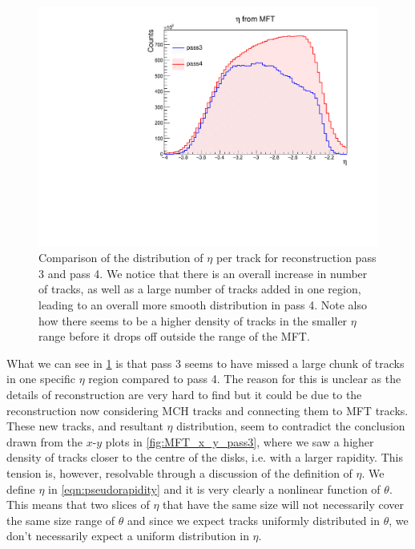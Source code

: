 \begin{figure}[H]
    \begin{center}
        \includegraphics[width=.8\textwidth]{Plots/pass3_pass4.pdf}
        \caption{Comparison of the distribution of $\eta$ per track for reconstruction pass 3 and pass 4. We notice that there is an overall increase in number of tracks, as well as a large number of tracks added in one region, leading to an overall more smooth distribution in pass 4. Note also how there seems to be a higher density of tracks in the smaller $\eta$ range before it drops off outside the range of the MFT.}
        \label{fig:pass3_pass4_eta}
    \end{center}
\end{figure}

What we can see in \cref{fig:pass3_pass4_eta} is that pass 3 seems to have missed a large chunk of tracks in one specific $\eta$ region compared to pass 4. The reason for this is unclear as the details of reconstruction are very hard to find but it could be due to the reconstruction now considering MCH tracks and connecting them to MFT tracks. These new tracks, and resultant $\eta$ distribution, seem to contradict the conclusion drawn from the $x$-$y$ plots in \cref{fig:MFT_x_y_pass3}, where we saw a higher density of tracks closer to the centre of the disks, i.e. with a larger rapidity. This tension is, however, resolvable through a discussion of the definition of $\eta$. We define $\eta$ in \cref{eqn:pseudorapidity} and it is very clearly a nonlinear function of $\theta$. This means that two slices of $\eta$ that have the same size will not necessarily cover the same size range of $\theta$ and since we expect tracks uniformly distributed in $\theta$, we don't necessarily expect a uniform distribution in $\eta$.

\bigskip

